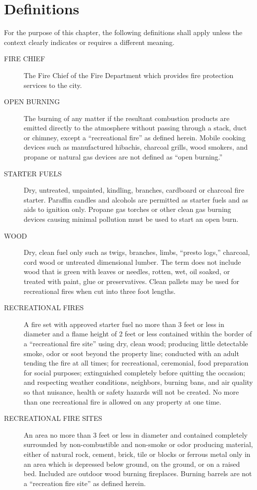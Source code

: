 \section{Definitions}
For the purpose of this chapter, the following definitions shall apply unless the context clearly indicates or requires a different meaning.
\begin{description}
    \item[FIRE CHIEF] The Fire Chief of the Fire Department which provides fire protection services to the city.
    \item[OPEN BURNING] The burning of any matter if the resultant combustion products are emitted directly to the atmosphere without passing through a stack, duct or chimney, except a “recreational fire” as defined herein. Mobile cooking devices such as manufactured hibachis, charcoal grills, wood smokers, and propane or natural gas devices are not defined as “open burning.”  
    \item[STARTER FUELS] Dry, untreated, unpainted, kindling, branches, cardboard or charcoal fire starter. Paraffin candles and alcohols are permitted as starter fuels and as aids to ignition only.  Propane gas torches or other clean gas burning devices causing minimal pollution must be used to start an open burn.
    \item[WOOD] Dry, clean fuel only such as twigs, branches, limbs, “presto logs,” charcoal, cord wood or untreated dimensional lumber. The term does not include wood that is green with leaves or needles, rotten, wet, oil soaked, or treated with paint, glue or preservatives. Clean pallets may be used for recreational fires when cut into three foot lengths.
    \item[RECREATIONAL FIRES] A fire set with approved starter fuel no more than 3 feet or less in diameter and a flame height of 2 feet or less contained within the border of a “recreational fire site” using dry, clean wood; producing little detectable smoke, odor or soot beyond the property line; conducted with an adult tending the fire at all times; for recreational, ceremonial, food preparation for social purposes; extinguished completely before quitting the occasion; and respecting weather conditions, neighbors, burning bans, and air quality so that nuisance, health or safety hazards will not be created. No more than one recreational fire is allowed on any property at one time.
    \item[RECREATIONAL FIRE SITES] An area no more than 3 feet or less in diameter and contained completely surrounded by non-combustible and non-smoke or odor producing material, either of natural rock, cement, brick, tile or blocks or ferrous metal only in an area which is depressed below ground, on the ground, or on a raised bed. Included are outdoor wood burning fireplaces. Burning barrels are not a “recreation fire site” as defined herein.
\end{description}
